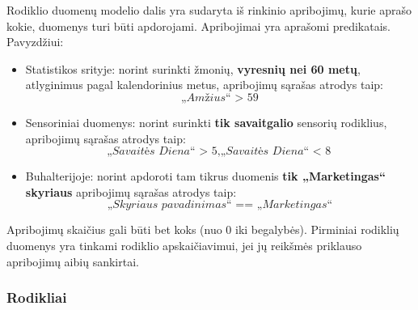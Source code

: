 \documentclass{VUMIFPSbakalaurinis}
\begin{document}
Rodiklio duomenų modelio dalis yra sudaryta iš rinkinio apribojimų, kurie aprašo kokie, duomenys turi būti apdorojami. Apribojimai yra aprašomi predikatais. Pavyzdžiui:
\begin{itemize}
    \item Statistikos srityje: norint surinkti žmonių, \textbf{vyresnių nei 60 metų}, atlyginimus pagal kalendorinius metus, apribojimų sąrašas atrodys taip: \[\textit{„Amžius“ > 59}\]
    \item Sensoriniai duomenys: norint surinkti \textbf{tik savaitgalio} sensorių rodiklius, apribojimų sąrašas atrodys taip: \[\textit{„Savaitės Diena“ > 5}, \textit{„Savaitės Diena“ < 8}\]
    \item Buhalterijoje: norint apdoroti tam tikrus duomenis \textbf{tik „Marketingas“ skyriaus} apribojimų sąrašas atrodys taip: \[\textit{„Skyriaus pavadinimas“ == „Marketingas“}\] 
\end{itemize} \par  
Apribojimų skaičius gali būti bet koks (nuo 0 iki begalybės). Pirminiai rodiklių duomenys yra tinkami rodiklio apskaičiavimui, jei jų reikšmės priklauso apribojimų aibių sankirtai.  

\subsubsection{Rodikliai}
\end{document}
